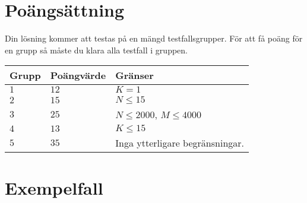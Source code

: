 \section*{Poängsättning}
Din lösning kommer att testas på en mängd testfallsgrupper.
För att få poäng för en grupp så måste du klara alla testfall i gruppen.

\noindent
\begin{tabular}{| l | l | l |}
  \hline
  Grupp & Poängvärde & Gränser \\ \hline
  $1$    & $12$        &  $K=1$ \\ \hline 
  $2$    & $15$        &  $N \leq 15$ \\ \hline
  $3$    & $25$        &  $N \leq 2000$, $M \leq 4000$ \\ \hline
  $4$    & $13$        &  $K \leq 15$ \\ \hline 
  $5$    & $35$       &  Inga ytterligare begränsningar. \\ \hline
\end{tabular}

\section*{Exempelfall}
